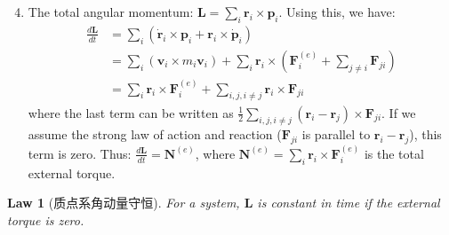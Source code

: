\documentclass[12pt,a4paper]{article}
\newtheorem{law}{Law}[section]
\theoremstyle{definition}
\theoremstyle{remark}
\renewcommand{\vec}[1]{\mathbf{#1}}
\begin{document}
	\begin{enumerate}
		\setcounter{enumi}{3}
		\item The total angular momentum: $\vec{L} = \sum_i \vec{r}_i \times \vec{p}_i$.
		Using this, we have:
		\begin{align*}
			\frac{d\vec{L}}{dt} &= \sum_i (\dot{\vec{r}}_i \times \vec{p}_i + \vec{r}_i \times \dot{\vec{p}}_i) \\
			&= \sum_i (\vec{v}_i \times m_i\vec{v}_i) + \sum_i \vec{r}_i \times (\vec{F}_i^{(e)} + \sum_{j \neq i} \vec{F}_{ji}) \\
			&= \sum_i \vec{r}_i \times \vec{F}_i^{(e)} + \sum_{i,j, i \neq j} \vec{r}_i \times \vec{F}_{ji}
		\end{align*}
		where the last term can be written as $\frac{1}{2}\sum_{i,j, i \neq j} (\vec{r}_i - \vec{r}_j) \times \vec{F}_{ji}$. If we assume the strong law of action and reaction ($\vec{F}_{ji}$ is parallel to $\vec{r}_i - \vec{r}_j$), this term is zero.
		Thus: $\frac{d\vec{L}}{dt} = \vec{N}^{(e)}$, where $\vec{N}^{(e)} = \sum_i \vec{r}_i \times \vec{F}_i^{(e)}$ is the total external torque.
		
	\end{enumerate}
	
	\begin{law}[质点系角动量守恒]
		For a system, $\vec{L}$ is constant in time if the external torque is zero.
	\end{law}
	
\end{document}
